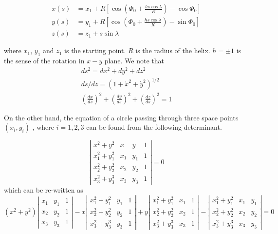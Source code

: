\begin{equation}
\begin{split}
x(s) &=x_{1} + R \left[\cos \left(\Phi_{0}+\frac{hs\cos \lambda}{R} \right)-\cos \Phi_{0} \right]\\
y(s) &=y_{1} + R \left[\cos \left(\Phi_{0}+\frac{hs\cos \lambda}{R} \right)-\sin \Phi_{0} \right]\\
z(s) &=z_{1}+s \sin \lambda
\end{split}
\end{equation}

where $x_{1}$, $y_{1}$ and $z_{1}$ is the starting point. $R$ is the radius of the helix.
$h=\pm 1$ is the sense of the rotation in $x-y$ plane. We note that
\begin{equation}
 \begin{split}
ds^2 =dx^2+dy^2+dz^2\\
ds/dz =(1+\acute{x}^2+\acute{y}^2)^{1/2}\\
(\frac{dx}{ds})^2 +(\frac{dy}{ds})^2 + (\frac{dz}{ds})^2 = 1
\end{split}
\end{equation}



On the other hand, the equation of a circle passing through three space points $(x_i,y_i)$ , where
$i=1,2,3$ can be found from the following determinant.

\begin{equation}
\left|
\begin{matrix}
x^2+y^2 & x & y & 1\\
x_1^2+y_1^2 & x_1 & y_1 & 1\\
x_2^2+y_2^2 & x_2 & y_2 & 1\\
x_3^2+y_3^3 & x_3 & y_3  & 1
\end{matrix}
\right|
=0
\end{equation}
which can be re-written as
\begin{equation}
(x^2+y^2)
\left|
\begin{matrix}
 x_1 & y_1 & 1\\
 x_2 & y_2 & 1\\
 x_3 & y_3 & 1
\end{matrix}
\right|
-x
\left|
\begin{matrix}
x_1^2+y_1^2 & y_1 & 1\\
x_2^2+y_2^2 & y_2 & 1\\
x_3^2+y_3^3 & y_3  & 1
\end{matrix}
\right|
+y
\left|
\begin{matrix}
x_1^2+y_1^2 & x_1 & 1\\
x_2^2+y_2^2 & x_2 & 1\\
x_3^2+y_3^3 & x_3 & 1
\end{matrix}
\right|
-
\left|
\begin{matrix}
x_1^2+y_1^2 & x_1 & y_1 \\
x_2^2+y_2^2 & x_2 & y_2 \\
x_3^2+y_3^3 & x_3 & y_3
\end{matrix}
\right|
=0
\end{equation}

